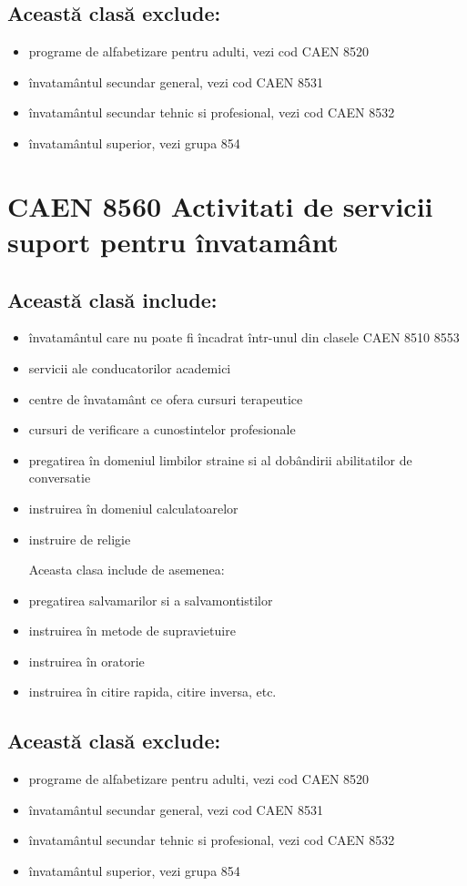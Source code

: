 \documentclass{article}
\begin{document}
\subsection*{Această clasă exclude:}
\begin{itemize}
\item programe de alfabetizare pentru adulti, vezi cod CAEN 8520
\item învatamântul secundar general, vezi cod CAEN 8531
\item învatamântul secundar tehnic si profesional, vezi cod CAEN 8532
\item învatamântul superior, vezi grupa 854
\end{itemize}

\section*{CAEN 8560 Activitati de servicii suport pentru învatamânt}
\subsection*{Această clasă include:}
\begin{itemize}
\item învatamântul care nu poate fi încadrat într-unul din clasele CAEN 8510 8553
\item servicii ale conducatorilor academici
\item centre de învatamânt ce ofera cursuri terapeutice
\item cursuri de verificare a cunostintelor profesionale
\item pregatirea în domeniul limbilor straine si al dobândirii abilitatilor de conversatie
\item instruirea în domeniul calculatoarelor
\item instruire de religie

Aceasta clasa include de asemenea:
\item pregatirea salvamarilor si a salvamontistilor
\item instruirea în metode de supravietuire
\item instruirea în oratorie
\item instruirea în citire rapida, citire inversa, etc.
\end{itemize}


\subsection*{Această clasă exclude:}
\begin{itemize}
\item programe de alfabetizare pentru adulti, vezi cod CAEN 8520
\item învatamântul secundar general, vezi cod CAEN 8531
\item învatamântul secundar tehnic si profesional, vezi cod CAEN 8532
\item învatamântul superior, vezi grupa 854
\end{itemize}
\end{document}
